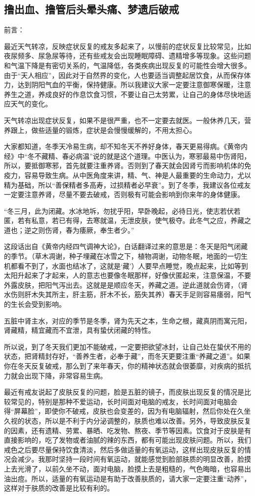 \documentclass[fontset=founder]{ctexart}
\begin{document}
\subsection{撸出血、撸管后头晕头痛、梦遗后破戒}

前言：

最近天气转凉，反映症状反复的戒友多起来了，以慢前的症状反复比较常见，比如夜尿频多、尿急尿等待，还有些戒友会出现睡眠障碍、遗精增多等现象。这些问题和气温下降是有密切关系的，气温降低，各类疾病出现反复的可能性会增大很多。由于“天人相应”，因此对于自然界的变化，人也要适当调整起居饮食，从而保存体力，达到阴阳气血的平衡，保持健康。所以我建议大家一定要注意御寒保暖，注意养生之道，养成良好的作息饮食习惯，不要让自己太劳累，让自己的身体尽快地适应天气的变化。

天气转凉出现症状反复，如果不是很严重，也不一定要去就医。一般休养几天，营养跟上，做些适量的锻炼，症状是会慢慢缓解的，不用太担心。

大家都知道，冬季天冷易生病，却不知冬天不养好身体，春天更易得病。《黄帝内经》中“冬不藏精、春必病温”说的就是这个道理。中医认为，寒邪最易中伤肾阳，所以，要抵御寒邪，首先就要注重养肾。否则到了春天就会因肾亏而影响机体的免疫力，容易导致生病。从中医角度来讲，精、气、神是人最重要的生命动力，尤以精为基础，所以“善保精者多高寿，过损精者必早衰”。到了冬季，我建议各位戒友一定要注意养肾，尽量不要去破戒，否则极有可能会影响到你来年的身体健康。

“冬三月，此为闭藏。水冰地坼，勿扰乎阳，早卧晚起，必待日光，使志若伏若匿，若有私意，若已有得，去寒就温，无泄皮肤，使气极夺。此冬气之应，养藏之道也；逆之则伤肾，春为痿厥，奉生者少。”

这段话出自《黄帝内经四气调神大论》，白话翻译过来的意思是：冬天是阳气闭藏的季节。（草木凋谢，种子埋藏在冰雪之下，植物凋谢，动物冬眠，地面的一切生机都看不到了，水面也结冰了，这就是‘藏’）人要早点睡觉，晚点起来，比如等到太阳升起来了才起来，人的意志也要像冬眠那样，好像伏匿起来，注意保温，不要外露皮肤，把阳气泻出去。这就是是顺应冬天，养藏之道。逆此道就会伤肾，（肾水伤则肝木失其所主，肝主筋，肝木不长，筋失其养）春天手足则容易痿弱，阳气的生长会受到影响。

五脏中肾主水，对应的季节是冬季，肾为先天之本，生命之根，藏真阴而寓元阳，肾藏精，精宜藏而不宜泄，具有蛰伏闭藏的特性。

所以说，到了冬天我们更加不能破戒，一定要把欲望冰封，让自己处在蛰伏不用的状态，把肾精封存好，“善养生者，必奉于藏”，而冬天更要注重“养藏之道”。如果你在冬天反复破戒，那么到了来年春天，你的精神状态就会很萎靡，对疾病的抵抗力就会出现下降，非常容易生病。

最近有戒友说起了皮肤反复的问题，脸是五脏的镜子，而皮肤出现反复的情况是比较常见的，特别是那种不爱运动，长时间面对电脑的戒友，长时间面对电脑会得“屏幕脸”，即使你不破戒，皮肤也会变差的，因为有电脑辐射，然后你处在久坐久视的状态，所以是不利于内分泌调整的，肤质也难以改善。另外，导致皮肤反复的因素，还有遗精、劳累、暴晒、吃发物、熬夜、季节等因素。饮食对于皮肤是有直接影响的，吃了发物或者油腻的辣的东西，都有可能出现皮肤问题。所以，我们戒色之后要尽量保持饮食清淡，然后多做适量的有氧运动，这样出现皮肤反复的情况会减少。我那时坚持一段时间有氧运动，就能感觉到脸部肤质的明显改善，脸摸上去光滑了，以前久坐不动，面对电脑，脸摸上去是粗糙的，气色晦暗，也容易出油出痘。所以，适量的有氧运动是有助于改善肤质的，请大家一定要注重“动养”，这样对于肤质的改善是比较有利的。
\end{document}
